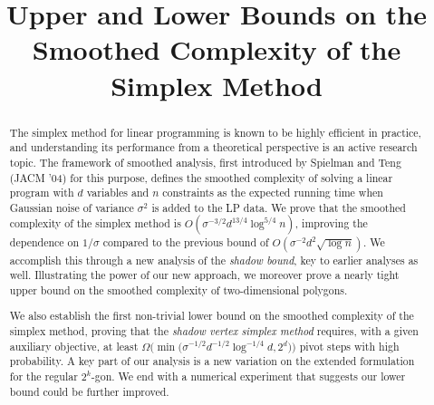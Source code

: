 \documentclass{theoretics}
\title{Upper and Lower Bounds on the Smoothed Complexity of the Simplex Method}
\begin{document}
\maketitle

\begin{abstract}
The simplex method for linear programming is known to be highly efficient in practice,
and understanding its performance from a theoretical perspective is an active research topic.
The framework of smoothed analysis, first introduced by Spielman and Teng (JACM '04)
for this purpose, defines the smoothed complexity of solving a linear program
with $d$ variables and $n$ constraints as the expected running time when
Gaussian noise of variance $\sigma^2$ is added to the LP data.
We prove that the smoothed complexity of the simplex method is
$O(\sigma^{-3/2} d^{13/4}\log^{5/4} n)$,
improving the dependence on $1/\sigma$ compared to the previous bound of
$O(\sigma^{-2} d^2\sqrt{\log n})$.
We accomplish this through a new analysis of the \emph{shadow bound},
key to earlier analyses as well.
Illustrating the power of our new approach, we moreover prove a
nearly tight upper bound on the smoothed complexity of two-dimensional
polygons.

We also establish the first non-trivial lower bound on the smoothed complexity
of the simplex method, proving that the \emph{shadow vertex simplex method}
requires, with a given auxiliary objective, at least
$\Omega \Big(\min \big(\sigma^{-1/2} d^{-1/2}\log^{-1/4} d,2^d \big) \Big)$
pivot steps with high probability. A key part of our analysis
is a new variation on the extended formulation for the regular $2^k$-gon.
We end with a numerical experiment that suggests our lower bound could
be further improved.
\end{abstract}

\end{document}
